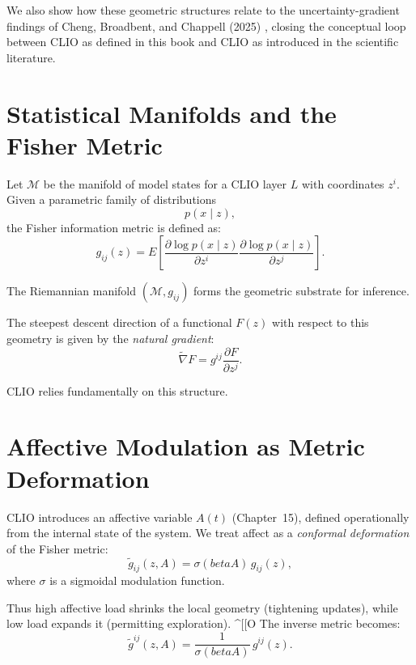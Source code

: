 \documentclass[12pt,oneside]{book}
\theoremstyle{plain}
\theoremstyle{definition}
\def\mathbb#1{#1}%
\def\beta{beta}%
\begin{document}
We also show how these geometric structures relate to the uncertainty-gradient
findings of Cheng, Broadbent, and Chappell (2025) \cite{Cheng2025CognitiveLV},
closing the conceptual loop between CLIO as defined in this book
and CLIO as introduced in the scientific literature.

\section{Statistical Manifolds and the Fisher Metric}

Let $\mathcal{M}$ be the manifold of model states for a CLIO layer $L$ with
coordinates $z^i$.
Given a parametric family of distributions
\[
p(x \mid z),
\]
the Fisher information metric is defined as:
\begin{equation}
\label{eq:fisher-metric}
g_{ij}(z)
=
\mathbb{E}
\left[
    \frac{\partial \log p(x \mid z)}{\partial z^i}
    \frac{\partial \log p(x \mid z)}{\partial z^j}
\right].
\end{equation}

The Riemannian manifold $(\mathcal{M}, g_{ij})$ forms the geometric substrate
for inference.

The steepest descent direction of a functional $F(z)$ with respect to this
geometry is given by the \emph{natural gradient}:
\begin{equation}
\label{eq:natural-grad}
\widetilde{\nabla} F
=
g^{ij} \frac{\partial F}{\partial z^j}.
\end{equation}

CLIO relies fundamentally on this structure.

\section{Affective Modulation as Metric Deformation}

CLIO introduces an affective variable $A(t)$ (Chapter~15), defined operationally
from the internal state of the system.
We treat affect as a \emph{conformal deformation} of the Fisher metric:
\begin{equation}
\label{eq:metric-def}
\tilde g_{ij}(z, A)
=
\sigma(\beta A)\, g_{ij}(z),
\end{equation}
where $\sigma$ is a sigmoidal modulation function.

Thus high affective load
shrinks the local geometry (tightening updates),
while low load expands it (permitting exploration).
^[[O
The inverse metric becomes:
\[
\tilde g^{ij}(z, A)
=
\frac{1}{\sigma(\beta A)}\, g^{ij}(z).
\]
\end{document}
